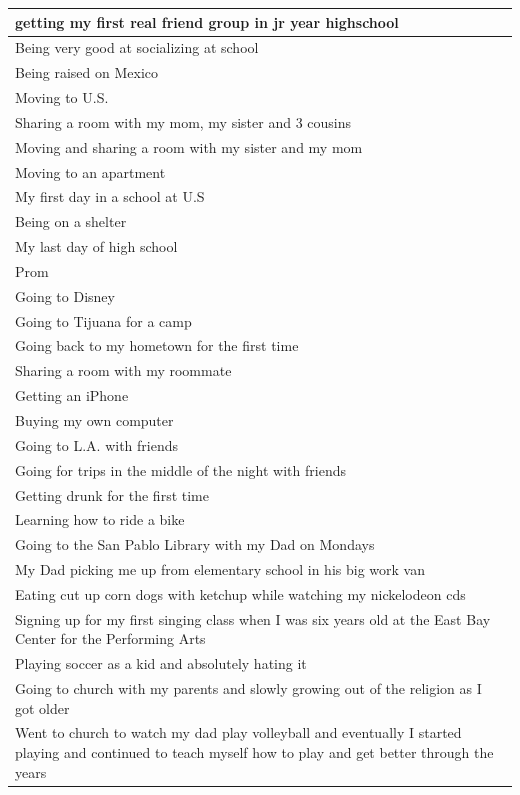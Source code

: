 \documentclass[
  .7em,
  letterpaper,
  DIV=11,
  numbers=noendperiod]{scrartcl}
\begin{document}
\begin{table}
\begin{tabular}{l}
\hline
getting my first real friend group in jr year highschool\\
\hline
Being very good at socializing at school\\
\hline
Being raised on Mexico\\
\hline
Moving to U.S.\\
\hline
Sharing a room with my mom, my sister and 3 cousins\\
\hline
Moving and sharing a room with my sister and my mom\\
\hline
Moving to an apartment\\
\hline
My first day in a school at U.S\\
\hline
Being on a shelter\\
\hline
My last day of high school\\
\hline
Prom\\
\hline
Going to Disney\\
\hline
Going to Tijuana for a camp\\
\hline
Going back to my hometown for the first time\\
\hline
Sharing a room with my roommate\\
\hline
Getting an iPhone\\
\hline
Buying my own computer\\
\hline
Going to L.A. with friends\\
\hline
Going for trips in the middle of the night with friends\\
\hline
Getting drunk for the first time\\
\hline
Learning how to ride a bike\\
\hline
Going to the San Pablo Library with my Dad on Mondays\\
\hline
My Dad picking me up from elementary school in his big work van\\
\hline
Eating cut up corn dogs with ketchup while watching my nickelodeon cds\\
\hline
Signing up for my first singing class when I was six years old at the East Bay Center for the Performing Arts\\
\hline
Playing soccer as a kid and absolutely hating it\\
\hline
Going to church with my parents and slowly growing out of the religion as I got older\\
\hline
Went to church to watch my dad play volleyball and eventually I started playing and continued to teach myself how to play and get better through the years\\

\end{tabular}
\end{table}
\end{document}
